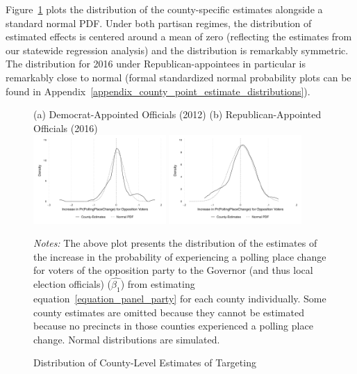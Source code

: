 \documentclass[12pt]{article}
\begin{document}
Figure~\ref{figure_normalitytests} plots the distribution of the county-specific estimates alongside a standard normal PDF.  Under both partisan regimes, the distribution of estimated effects is centered around a mean of zero (reflecting the estimates from our statewide regression analysis) and the distribution is remarkably symmetric.  The distribution for 2016 under Republican-appointees in particular is remarkably close to normal (formal standardized normal probability plots can be found in Appendix~\ref{appendix_county_point_estimate_distributions}).

\begin{figure}[t!]
	\begin{center}
	\caption{Distribution of County-Level Estimates of Targeting}\label{figure_normalitytests}
		\small
		\bigskip
    (a) Democrat-Appointed Officials (2012) \hspace*{.5in} (b) Republican-Appointed Officials (2016) \\
		\includegraphics[width=0.45\textwidth]{../../50_results_full/county_point_estimate_density_w_norm_pp_has_changed_2012.pdf}        \includegraphics[width=0.45\textwidth]{../../50_results_full/county_point_estimate_density_w_norm_pp_has_changed_2016.pdf}
		\end{center}
    \scriptsize{\emph{Notes:}   The above plot presents the distribution of the estimates of the increase in the probability of experiencing a polling place change for voters of the opposition party to the Governor (and thus local election officials) ($\hat{\beta_{1}}$) from estimating equation~\ref{equation_panel_party} for each county individually. Some county estimates are omitted because they cannot be estimated because no precincts in those counties experienced a polling place change.  Normal distributions are simulated.}
\end{figure} \normalsize
\end{document}
